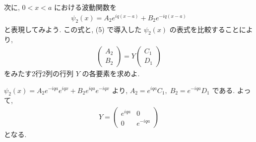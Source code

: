 \documentclass[../../ou-physics-exam.tex]{subfiles}
\begin{document}
次に, $ 0 < x < a $ における波動関数を
\begin{align*}
    \psi_2 (x) = A_2 e^{iq(x-a)} + B_2 e^{-iq(x-a)}
\end{align*}
と表現してみよう. 
この式と, (5) で導入した $ \psi_2 (x) $ の表式を比較することにより,
\begin{align*}
    \begin{pmatrix}
        A_2 \\ B_2
    \end{pmatrix} = Y
    \begin{pmatrix}
        C_1 \\ D_1
    \end{pmatrix}
\end{align*}
をみたす2行2列の行列 $ Y $ の各要素を求めよ.
\begin{answer}
    $ \psi_2 (x) = A_2 e^{-iqa} e^{iqx} + B_2 e^{iqa} e^{-iqx} $ より, $ A_2 = e^{iqa} C_1, \; B_2 = e^{-iqa} D_1 $ である. 
    よって,
    \begin{align*}
        Y = 
        \begin{pmatrix}
            e^{iqa} & 0 \\
            0 & e^{-iqa}
        \end{pmatrix}
    \end{align*}
    となる.
\end{answer}
\end{document}
